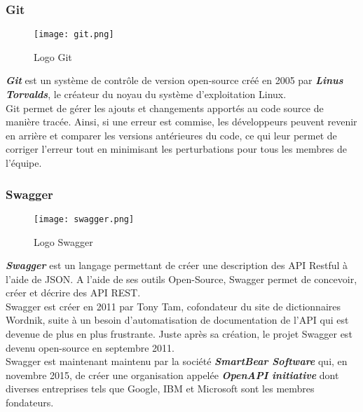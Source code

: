 \subsubsection{Git}
\vspace{1cm}
\begin{figure}[H]
    \centering
    \texttt{[image: git.png]}
    \vspace{1cm}
    \caption{Logo Git}
    \label{fig:git_logo}
\end{figure}
\textit{\textbf{Git}} est un système de contrôle de version open-source créé en 2005 par \textit{\textbf{Linus Torvalds}}, le créateur du noyau du système d'exploitation Linux.\\
\noindent Git permet de gérer les ajouts et changements apportés au code source de manière tracée. Ainsi, si une erreur est commise, les développeurs peuvent revenir en arrière et comparer les versions antérieures du code, ce qui leur permet de corriger l'erreur tout en minimisant les perturbations pour tous les membres de l'équipe.
\subsubsection{Swagger}
\vspace{1cm}
\begin{figure}[H]
    \centering
    \texttt{[image: swagger.png]}
    \vspace{1cm}
    \caption{Logo Swagger}
    \label{fig:swagger_logo}
\end{figure}
\textit{\textbf{Swagger}} est un langage permettant de créer une description des API Restful à l'aide de JSON. A l'aide de ses outils Open-Source, Swagger permet de concevoir, créer et décrire des API REST.\\
\noindent Swagger est créer en 2011 par Tony Tam, cofondateur du site de dictionnaires Wordnik, suite à un besoin d'automatisation de documentation de l'API qui est devenue de plus en plus frustrante. Juste après sa création, le projet Swagger est devenu open-source en septembre 2011.\\
\noindent Swagger est maintenant maintenu par la société \textit{\textbf{SmartBear Software}} qui, en novembre 2015, de créer une organisation appelée \textit{\textbf{OpenAPI initiative}} dont diverses entreprises tels que Google, IBM et Microsoft sont les membres fondateurs.\\



